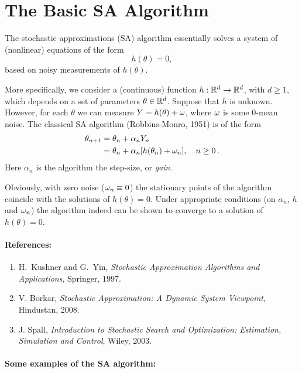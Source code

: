 \section{The Basic SA Algorithm}

The stochastic approximations (SA) algorithm essentially solves a system
of (nonlinear) equations of the form
$$
h(\theta) = 0,
$$
based on noisy measurements of $h(\theta)$.

More specifically, we consider a (continuous) function $h: \mathbb{R}^d \to \mathbb{R}^d$,
with $d\ge 1$, which depends on a set of parameters $\theta \in\mathbb{R}^d$.
Suppose that $h$ is unknown. However, for each $\theta$  we can measure
$Y= h(\theta) + \omega$, where $\omega$ is some $0$-mean noise.
The classical SA algorithm (Robbins-Monro, 1951) is of the form
\begin{align*}
\theta_{n+1} & = \theta_n + \alpha_n Y_n \\
& = \theta_n + \alpha_n[h(\theta_n)
+ \omega_n], \quad n \ge 0\,.
\end{align*}
Here $\alpha_n$ is the algorithm the step-size, or {\em gain}.

Obviously, with zero noise ($\omega_n\equiv 0$) the stationary points of the algorithm
coincide with the solutions of $h(\theta)=0$.
Under appropriate conditions (on $\alpha_n$, $h$ and $\omega_n$) the algorithm
indeed can be shown to converge to a solution of $h(\theta)=0$.

\paragraph{References:
}\begin{enumerate}
  \item H.~Kushner and G.~Yin, {\em Stochastic Approximation Algorithms and Applications},
Springer, 1997.

  \item V. Borkar, {\em Stochastic Approximation: A Dynamic System Viewpoint}, Hindustan, 2008.

  \item J. Spall, {\em Introduction to Stochastic Search and Optimization: Estimation, Simulation
and Control}, Wiley, 2003.
\end{enumerate}

\paragraph{Some examples of the SA algorithm:}

